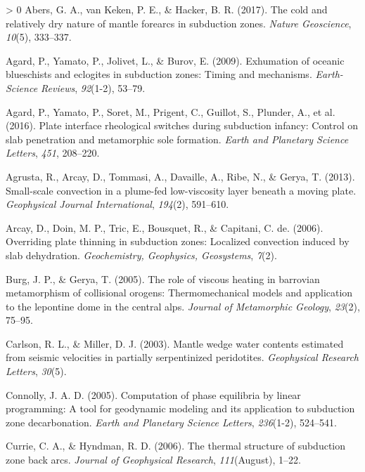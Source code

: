 \documentclass[draft,linenumbers]{agujournal2018}
\newlength{\cslhangindent}
\newenvironment{CSLReferences}[3] %
 {%
  \setlength{\parindent}{0pt}
  \ifodd #1 \everypar{\setlength{\hangindent}{\cslhangindent}}\ignorespaces\fi
  \ifnum #2 > 0
  \setlength{\parskip}{#2\baselineskip}
  \fi
 }%
 {}
\begin{document}
\hypertarget{refs}{}
\begin{CSLReferences}{1}{0}
\leavevmode\hypertarget{ref-Abers2017}{}%
Abers, G. A., van Keken, P. E., \& Hacker, B. R. (2017). {The cold and
relatively dry nature of mantle forearcs in subduction zones}.
\emph{Nature Geoscience}, \emph{10}(5), 333--337.

\leavevmode\hypertarget{ref-Agard2009}{}%
Agard, P., Yamato, P., Jolivet, L., \& Burov, E. (2009). {Exhumation of
oceanic blueschists and eclogites in subduction zones: Timing and
mechanisms}. \emph{Earth-Science Reviews}, \emph{92}(1-2), 53--79.

\leavevmode\hypertarget{ref-Agard2016}{}%
Agard, P., Yamato, P., Soret, M., Prigent, C., Guillot, S., Plunder, A.,
et al. (2016). {Plate interface rheological switches during subduction
infancy: Control on slab penetration and metamorphic sole formation}.
\emph{Earth and Planetary Science Letters}, \emph{451}, 208--220.

\leavevmode\hypertarget{ref-Agrusta2013}{}%
Agrusta, R., Arcay, D., Tommasi, A., Davaille, A., Ribe, N., \& Gerya,
T. (2013). {Small-scale convection in a plume-fed low-viscosity layer
beneath a moving plate}. \emph{Geophysical Journal International},
\emph{194}(2), 591--610.

\leavevmode\hypertarget{ref-Arcay2006}{}%
Arcay, D., Doin, M. P., Tric, E., Bousquet, R., \& Capitani, C. de.
(2006). Overriding plate thinning in subduction zones: Localized
convection induced by slab dehydration. \emph{Geochemistry, Geophysics,
Geosystems}, \emph{7}(2).

\leavevmode\hypertarget{ref-Burg2005}{}%
Burg, J. P., \& Gerya, T. (2005). The role of viscous heating in
barrovian metamorphism of collisional orogens: Thermomechanical models
and application to the lepontine dome in the central alps. \emph{Journal
of Metamorphic Geology}, \emph{23}(2), 75--95.

\leavevmode\hypertarget{ref-Carlson2003}{}%
Carlson, R. L., \& Miller, D. J. (2003). Mantle wedge water contents
estimated from seismic velocities in partially serpentinized
peridotites. \emph{Geophysical Research Letters}, \emph{30}(5).

\leavevmode\hypertarget{ref-Connolly2005}{}%
Connolly, J. A. D. (2005). {Computation of phase equilibria by linear
programming: A tool for geodynamic modeling and its application to
subduction zone decarbonation}. \emph{Earth and Planetary Science
Letters}, \emph{236}(1-2), 524--541.

\leavevmode\hypertarget{ref-Currie2006}{}%
Currie, C. A., \& Hyndman, R. D. (2006). {The thermal structure of
subduction zone back arcs}. \emph{Journal of Geophysical Research},
\emph{111}(August), 1--22.


\end{CSLReferences}
\end{document}
